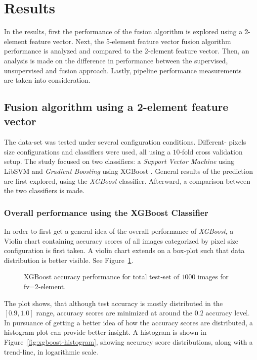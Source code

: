 
\section{Results}\label{sec:results}
In the results, first the performance of the fusion algorithm is explored using a 2-element feature vector. Next, the 5-element feature vector fusion algorithm performance is analyzed and compared to the 2-element feature vector. Then, an analysis is made on the difference in performance between the supervised, unsupervised and fusion approach. Lastly, pipeline performance measurements are taken into consideration.

\subsection{Fusion algorithm using a 2-element feature vector}\label{sec:results_2-elem-fv}
The data-set was tested under several configuration conditions. Different- pixels size configurations and classifiers were used, all using a $10$-fold cross validation setup. The study focused on two classifiers: a \textit{Support Vector Machine} using LibSVM \citep{chang2011libsvm} and \textit{Gradient Boosting} using XGBoost \citep{chen2016xgboost}. General results of the prediction are first explored, using the \textit{XGBoost} classifier. Afterward, a comparison between the two classifiers is made.

\subsubsection{Overall performance using the XGBoost Classifier}
In order to first get a general idea of the overall performance of \textit{XGBoost}, a Violin chart containing accuracy scores of all images categorized by pixel size configuration is first taken. A violin chart extends on a box-plot such that data distribution is better visible. See Figure~\ref{fig:xgboost-violinplot}.

\begin{figure}[ht]
  \centering
  
  \caption{XGBoost accuracy performance for total test-set of $1000$ images for fv=2-element.
  }\label{fig:xgboost-violinplot}
\end{figure}

The plot shows, that although test accuracy is mostly distributed in the $[0.9, 1.0]$ range, accuracy scores are minimized at around the $0.2$ accuracy level. In pursuance of getting a better idea of how the accuracy scores are distributed, a histogram plot can provide better insight. A histogram is shown in Figure~\ref{fig:xgboost-histogram}, showing accuracy score distributions, along with a trend-line, in logarithmic scale.

